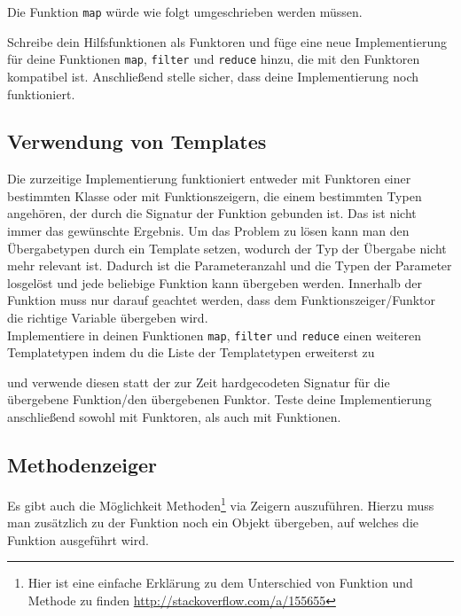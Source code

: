 Die Funktion \lstinline{map} würde wie folgt umgeschrieben werden müssen.



Schreibe dein Hilfsfunktionen als Funktoren und füge eine neue Implementierung für deine Funktionen \lstinline{map}, \lstinline{filter} und \lstinline{reduce} hinzu, die mit den Funktoren kompatibel ist.
Anschließend stelle sicher, dass deine Implementierung noch funktioniert.

\subsection{Verwendung von Templates}
\label{sec:functional_template}
Die zurzeitige Implementierung funktioniert entweder mit Funktoren einer bestimmten Klasse oder mit Funktionszeigern, die einem bestimmten Typen angehören, der durch die Signatur der Funktion gebunden ist.
Das ist nicht immer das gewünschte Ergebnis.
Um das Problem zu lösen kann man den Übergabetypen durch ein Template setzen, wodurch der Typ der Übergabe nicht mehr relevant ist.
Dadurch ist die Parameteranzahl und die Typen der Parameter losgelöst und jede beliebige Funktion kann übergeben werden.
Innerhalb der Funktion muss nur darauf geachtet werden, dass dem Funktionszeiger/Funktor die richtige Variable übergeben wird. \\

Implementiere in deinen Funktionen \lstinline{map}, \lstinline{filter} und \lstinline{reduce} einen weiteren Templatetypen indem du die Liste der Templatetypen erweiterst zu 



und verwende diesen statt der zur Zeit hardgecodeten Signatur für die übergebene Funktion/den übergebenen Funktor.
Teste deine Implementierung anschließend sowohl mit Funktoren, als auch mit Funktionen.

\subsection{Methodenzeiger}
\label{sec:functional_method}
Es gibt auch die Möglichkeit Methoden\footnote{Hier ist eine einfache Erklärung zu dem Unterschied von Funktion und Methode zu finden \url{http://stackoverflow.com/a/155655}} via Zeigern auszuführen.
Hierzu muss man zusätzlich zu der Funktion noch ein Objekt übergeben, auf welches die Funktion ausgeführt wird. \\

